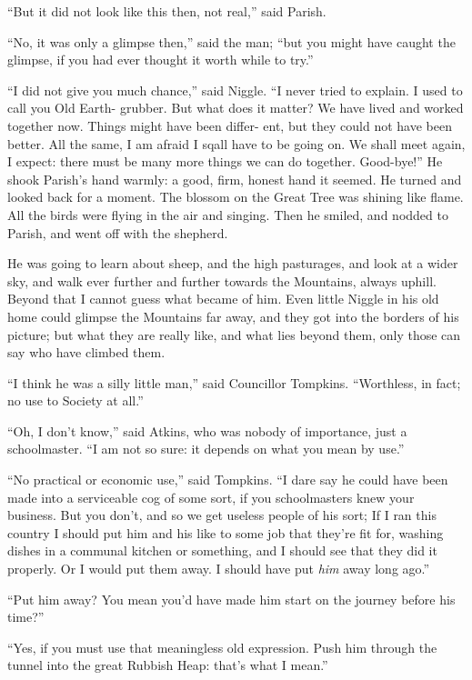 \documentclass[english]{scrartcl}
\begin{document}
“But it did not look like this then, not real,” said Parish.

“No, it was only a glimpse then,” said the man; “but you might have caught the glimpse, if you had ever thought it worth while to try.”

“I did not give you much chance,” said Niggle. “I never tried to explain. I used to call you Old Earth- grubber. But what does it matter? We have lived and worked together now. Things might have been differ- ent, but they could not have been better. All the same, I am afraid I sqall have to be going on. We shall meet again, I expect: there must be many more things we can do together. Good-bye!” He shook Parish’s hand warmly: a good, firm, honest hand it seemed. He turned and looked back for a moment. The blossom on the Great Tree was shining like flame. All the birds were flying in the air and singing. Then he smiled, and nodded to Parish, and went off with the shepherd.

He was going to learn about sheep, and the high pasturages, and look at a wider sky, and walk ever further and further towards the Mountains, always uphill. Beyond that I cannot guess what became of him. Even little Niggle in his old home could glimpse the Mountains far away, and they got into the borders of his picture; but what they are really like, and what lies beyond them, only those can say who have climbed them.

“I think he was a silly little man,” said Councillor Tompkins. “Worthless, in fact; no use to Society at all.”

“Oh, I don’t know,” said Atkins, who was nobody of importance, just a schoolmaster. “I am not so sure: it depends on what you mean by use.”

“No practical or economic use,” said Tompkins. “I dare say he could have been made into a serviceable cog of some sort, if you schoolmasters knew your business. But you don’t, and so we get useless people of his sort; If I ran this country I should put him and his like to some job that they’re fit for, washing dishes in a communal kitchen or something, and I should see that they did it properly. Or I would put them away. I should have put \emph{him} away long ago.”

“Put him away? You mean you’d have made him start on the journey before his time?”

“Yes, if you must use that meaningless old expression. Push him through the tunnel into the great Rubbish Heap: that’s what I mean.”
\end{document}
